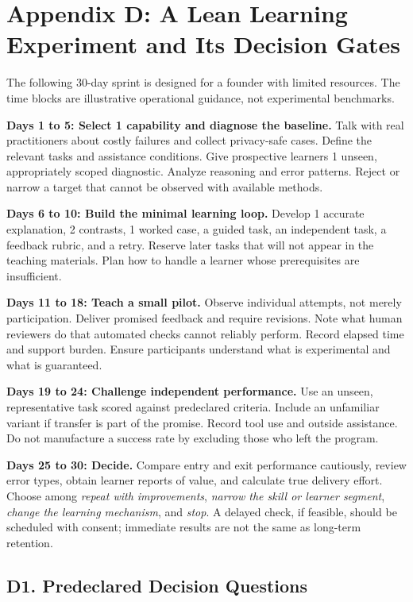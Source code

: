 \section*{Appendix D: A Lean Learning Experiment and Its Decision Gates}

The following 30-day sprint is designed for a founder with limited resources. The time blocks are illustrative operational guidance, not experimental benchmarks.

\textbf{Days 1 to 5: Select 1 capability and diagnose the baseline.} Talk with real practitioners about costly failures and collect privacy-safe cases. Define the relevant tasks and assistance conditions. Give prospective learners 1 unseen, appropriately scoped diagnostic. Analyze reasoning and error patterns. Reject or narrow a target that cannot be observed with available methods.

\textbf{Days 6 to 10: Build the minimal learning loop.} Develop 1 accurate explanation, 2 contrasts, 1 worked case, a guided task, an independent task, a feedback rubric, and a retry. Reserve later tasks that will not appear in the teaching materials. Plan how to handle a learner whose prerequisites are insufficient.

\textbf{Days 11 to 18: Teach a small pilot.} Observe individual attempts, not merely participation. Deliver promised feedback and require revisions. Note what human reviewers do that automated checks cannot reliably perform. Record elapsed time and support burden. Ensure participants understand what is experimental and what is guaranteed.

\textbf{Days 19 to 24: Challenge independent performance.} Use an unseen, representative task scored against predeclared criteria. Include an unfamiliar variant if transfer is part of the promise. Record tool use and outside assistance. Do not manufacture a success rate by excluding those who left the program.

\textbf{Days 25 to 30: Decide.} Compare entry and exit performance cautiously, review error types, obtain learner reports of value, and calculate true delivery effort. Choose among \emph{repeat with improvements}, \emph{narrow the skill or learner segment}, \emph{change the learning mechanism}, and \emph{stop}. A delayed check, if feasible, should be scheduled with consent; immediate results are not the same as long-term retention.

\subsection*{D1. Predeclared Decision Questions}


